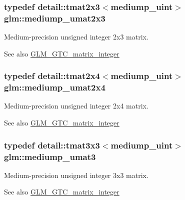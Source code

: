 \subsubsection[{mediump\+\_\+umat2x3}]{\setlength{\rightskip}{0pt plus 5cm}typedef detail\+::tmat2x3$<$mediump\+\_\+uint$>$ {\bf glm\+::mediump\+\_\+umat2x3}}\label{group__gtc__matrix__integer_gaa377342a4abe7f415218710e531b2731}
Medium-\/precision unsigned integer 2x3 matrix. \begin{DoxySeeAlso}{See also}
\hyperlink{group__gtc__matrix__integer}{G\+L\+M\+\_\+\+G\+T\+C\+\_\+matrix\+\_\+integer} 
\end{DoxySeeAlso}
\hypertarget{group__gtc__matrix__integer_ga62b45add166ab5be4e325a2cadec240d}{}
\subsubsection[{mediump\+\_\+umat2x4}]{\setlength{\rightskip}{0pt plus 5cm}typedef detail\+::tmat2x4$<$mediump\+\_\+uint$>$ {\bf glm\+::mediump\+\_\+umat2x4}}\label{group__gtc__matrix__integer_ga62b45add166ab5be4e325a2cadec240d}
Medium-\/precision unsigned integer 2x4 matrix. \begin{DoxySeeAlso}{See also}
\hyperlink{group__gtc__matrix__integer}{G\+L\+M\+\_\+\+G\+T\+C\+\_\+matrix\+\_\+integer} 
\end{DoxySeeAlso}
\hypertarget{group__gtc__matrix__integer_ga126ed770ed9106de1441a5a788e6485d}{}
\subsubsection[{mediump\+\_\+umat3}]{\setlength{\rightskip}{0pt plus 5cm}typedef detail\+::tmat3x3$<$mediump\+\_\+uint$>$ {\bf glm\+::mediump\+\_\+umat3}}\label{group__gtc__matrix__integer_ga126ed770ed9106de1441a5a788e6485d}
Medium-\/precision unsigned integer 3x3 matrix. \begin{DoxySeeAlso}{See also}
\hyperlink{group__gtc__matrix__integer}{G\+L\+M\+\_\+\+G\+T\+C\+\_\+matrix\+\_\+integer} 
\end{DoxySeeAlso}
\hypertarget{group__gtc__matrix__integer_gaa8022553d8ad1a133f9ebe75a50dbee1}{}
